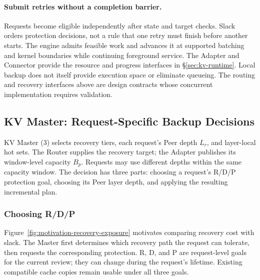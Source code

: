 \paragraph{Submit retries without a completion barrier.}
Requests become eligible independently after state and target checks.
Slack orders protection decisions, not a rule that one retry must finish
before another starts. The engine admits feasible work and advances it
at supported batching and kernel boundaries while continuing foreground
service. The Adapter and Connector provide the resource and progress
interfaces in \S\ref{sec:kv-runtime}. Local backup does not itself provide execution
space or eliminate queueing. The routing and recovery interfaces above
are design contracts whose concurrent implementation requires validation.

\subsection{KV Master: Request-Specific Backup Decisions}
\label{sec:kv-placement}
\label{sec:kv-master}

KV Master (3) selects recovery tiers, each request's Peer depth $L_r$,
and layer-local hot sets. The Router supplies the recovery target;
the Adapter publishes its window-level capacity $B_p$. Requests may use
different depths within the same capacity window.
The decision has three parts: choosing a request's R/D/P protection goal,
choosing its Peer layer depth, and applying the resulting incremental plan.

\subsubsection{Choosing R/D/P}
\label{sec:kv-master-rdp}

Figure~\ref{fig:motivation-recovery-exposure} motivates comparing recovery cost with
slack. The Master first determines which recovery path the request can
tolerate, then requests the corresponding protection. R, D, and P are
request-level goals for the current review; they can change during the
request's lifetime. Existing compatible cache copies remain usable under
all three goals.

